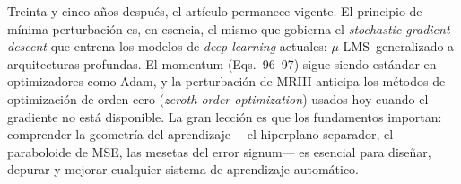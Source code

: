 \documentclass[11pt,a4paper]{article}
\newcommand{\muLMS}{$\mu$-LMS}
\begin{document}
Treinta y cinco años después, el artículo permanece vigente. El principio de mínima perturbación es,
en esencia, el mismo que gobierna el \textit{stochastic gradient descent} que entrena los modelos
de \textit{deep learning} actuales: \muLMS~generalizado a arquitecturas profundas. El momentum
(Eqs.~96--97) sigue siendo estándar en optimizadores como Adam, y la perturbación de MRIII anticipa
los métodos de optimización de orden cero (\textit{zeroth-order optimization}) usados hoy cuando el
gradiente no está disponible. La gran lección es que los fundamentos importan: comprender la
geometría del aprendizaje —el hiperplano separador, el paraboloide de MSE, las mesetas del error
signum— es esencial para diseñar, depurar y mejorar cualquier sistema de aprendizaje automático.

\end{document}
